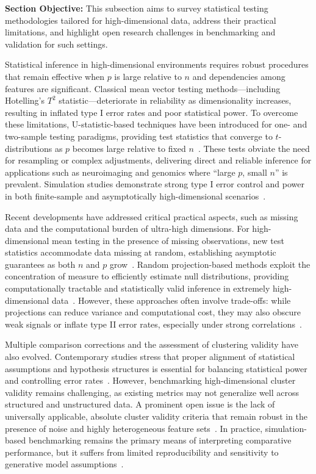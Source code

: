 \documentclass[sigconf]{acmart}
\begin{document}
\textbf{Section Objective:} This subsection aims to survey statistical testing methodologies tailored for high-dimensional data, address their practical limitations, and highlight open research challenges in benchmarking and validation for such settings.

Statistical inference in high-dimensional environments requires robust procedures that remain effective when $p$ is large relative to $n$ and dependencies among features are significant. Classical mean vector testing methods—including Hotelling’s $T^2$ statistic—deteriorate in reliability as dimensionality increases, resulting in inflated type I error rates and poor statistical power. To overcome these limitations, U-statistic-based techniques have been introduced for one- and two-sample testing paradigms, providing test statistics that converge to $t$-distributions as $p$ becomes large relative to fixed $n$~\cite{ref91,ref95}. These tests obviate the need for resampling or complex adjustments, delivering direct and reliable inference for applications such as neuroimaging and genomics where ``large $p$, small $n$'' is prevalent. Simulation studies demonstrate strong type I error control and power in both finite-sample and asymptotically high-dimensional scenarios~\cite{ref95}.

Recent developments have addressed critical practical aspects, such as missing data and the computational burden of ultra-high dimensions. For high-dimensional mean testing in the presence of missing observations, new test statistics accommodate data missing at random, establishing asymptotic guarantees as both $n$ and $p$ grow~\cite{ref94}. Random projection-based methods exploit the concentration of measure to efficiently estimate null distributions, providing computationally tractable and statistically valid inference in extremely high-dimensional data~\cite{ref91,ref92,ref93}. However, these approaches often involve trade-offs: while projections can reduce variance and computational cost, they may also obscure weak signals or inflate type II error rates, especially under strong correlations~\cite{ref93}.

Multiple comparison corrections and the assessment of clustering validity have also evolved. Contemporary studies stress that proper alignment of statistical assumptions and hypothesis structures is essential for balancing statistical power and controlling error rates~\cite{ref95,ref110,ref113}. However, benchmarking high-dimensional cluster validity remains challenging, as existing metrics may not generalize well across structured and unstructured data. A prominent open issue is the lack of universally applicable, absolute cluster validity criteria that remain robust in the presence of noise and highly heterogeneous feature sets~\cite{ref113}. In practice, simulation-based benchmarking remains the primary means of interpreting comparative performance, but it suffers from limited reproducibility and sensitivity to generative model assumptions~\cite{ref95,ref93}.
\end{document}

